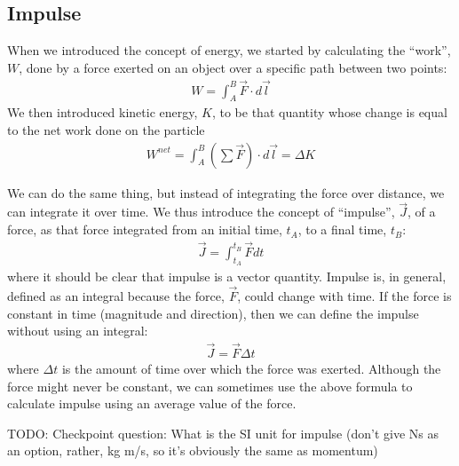 \subsection{Impulse}
When we introduced the concept of energy, we started by calculating the ``work'', $W$, done by a force exerted on an object over a specific path between two points:
\begin{align*}
W = \int_A^B \vec F \cdot d\vec l
\end{align*}
We then introduced kinetic energy, $K$, to be that quantity whose change is equal to the net work done on the particle
\begin{align*}
W^{net} = \int_A^B \left(\sum \vec F\right) \cdot d\vec l = \Delta K
\end{align*}

We can do the same thing, but instead of integrating the force over distance, we can integrate it over time. We thus introduce the concept of ``impulse'', $\vec J$, of a force, as that force integrated from an initial time, $t_A$, to a final time, $t_B$:
\begin{align}
\vec J = \int_{t_A}^{t_B}\vec F dt
\end{align}
where it should be clear that impulse is a vector quantity. Impulse is, in general, defined as an integral because the force, $\vec F$, could change with time. If the force is constant in time (magnitude and direction), then we can define the impulse without using an integral:
\begin{align*}
\vec J = \vec F \Delta t
\end{align*}
where $\Delta t$ is the amount of time over which the force was exerted. Although the force might never be constant, we can sometimes use the above formula to calculate impulse using an average value of the force.

TODO: Checkpoint question: What is the SI unit for impulse (don't give Ns as an option, rather, kg m/s, so it's obviously the same as momentum)


